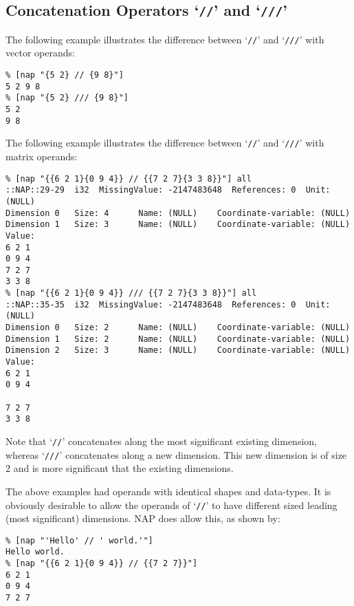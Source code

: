   \subsection{
    \label{Concatenation}Concatenation Operators `\texttt{//}' and `\texttt{///}'
  }

  \par The following example illustrates the difference between `\texttt{//}' and `\texttt{///}' with vector operands:
  \begin{verbatim}
% [nap "{5 2} // {9 8}"]
5 2 9 8
% [nap "{5 2} /// {9 8}"]
5 2
9 8
\end{verbatim}

  \par The following example illustrates the difference between `\texttt{//}' and `\texttt{///}' with matrix operands:
  \begin{verbatim}
% [nap "{{6 2 1}{0 9 4}} // {{7 2 7}{3 3 8}}"] all
::NAP::29-29  i32  MissingValue: -2147483648  References: 0  Unit:
(NULL)
Dimension 0   Size: 4      Name: (NULL)    Coordinate-variable: (NULL)
Dimension 1   Size: 3      Name: (NULL)    Coordinate-variable: (NULL)
Value:
6 2 1
0 9 4
7 2 7
3 3 8
% [nap "{{6 2 1}{0 9 4}} /// {{7 2 7}{3 3 8}}"] all
::NAP::35-35  i32  MissingValue: -2147483648  References: 0  Unit:
(NULL)
Dimension 0   Size: 2      Name: (NULL)    Coordinate-variable: (NULL)
Dimension 1   Size: 2      Name: (NULL)    Coordinate-variable: (NULL)
Dimension 2   Size: 3      Name: (NULL)    Coordinate-variable: (NULL)
Value:
6 2 1
0 9 4

7 2 7
3 3 8
\end{verbatim}

  \par Note that `\texttt{//}' concatenates along the most significant
  existing dimension, whereas `\texttt{///}' concatenates along a new dimension. This new
  dimension is of size 2 and is more significant that the existing
  dimensions.
  \par The above examples had operands with identical shapes and
  data-types. It is obviously desirable to allow the operands of `\texttt{//}' to have different sized leading (most
  significant) dimensions. NAP does allow this, as shown by:
  \begin{verbatim}
% [nap "'Hello' // ' world.'"]
Hello world.
% [nap "{{6 2 1}{0 9 4}} // {{7 2 7}}"]
6 2 1
0 9 4
7 2 7
\end{verbatim}

